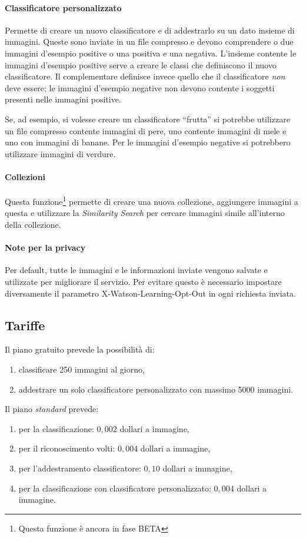\documentclass[fleqn,a4paper,11pt]{report}
\begin{document}
\paragraph{Classificatore personalizzato} Permette di creare un nuovo classificatore e di addestrarlo su un dato insieme di immagini. Queste sono inviate in un file compresso e devono comprendere o due immagini d'esempio positive o una positiva e una negativa. L'insieme contente le immagini d'esempio positive serve a creare le classi che definiscono il nuovo classificatore. Il complementare definisce invece quello che il classificatore \textit{non} deve essere; le immagini d'esempio negative non devono contente i soggetti presenti nelle immagini positive.

Se, ad esempio, si volesse creare un classificatore ``frutta'' si potrebbe utilizzare un file compresso contente immagini di pere, uno contente immagini di mele e uno con immagini di banane.
Per le immagini d'esempio negative si potrebbero utilizzare immagini di verdure.

\paragraph{Collezioni} Questa funzione\footnote{Questa funzione è ancora in fase BETA} permette di creare una nuova collezione, aggiungere immagini a questa e utilizzare la \textit{Similarity Search} per cercare immagini simile all'interno della collezione.

\paragraph{Note per la privacy} Per default, tutte le immagini e le informazioni inviate vengono salvate e utilizzate per migliorare il servizio. Per evitare questo è necessario impostare diversamente il parametro \textsf{X-Watson-Learning-Opt-Out} in ogni richiesta inviata.

\subsection{Tariffe}
Il piano gratuito prevede la possibilità di:
\begin{enumerate}
\item classificare 250 immagini al giorno,
\item addestrare un solo classificatore personalizzato con massimo 5000 immagini.
\end{enumerate}
Il piano \textit{standard} prevede:
\begin{enumerate}
\item per la classificazione: $0,002$ dollari a immagine,
\item per il riconoscimento volti: $0,004$ dollari a immagine,
\item per l'addestramento classificatore: $0,10$ dollari a immagine,
\item per la classificazione con classificatore personalizzato: $0,004$ dollari a immagine.
\end{enumerate}
\end{document}
